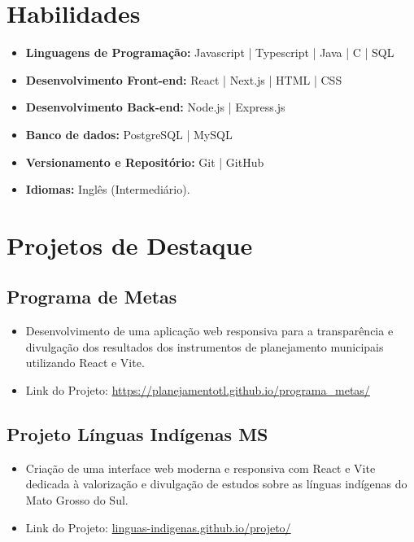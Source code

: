 \documentclass[a4paper,10pt]{article}
\begin{document}

\section{Habilidades}
    \begin{itemize}
        \item \textbf{Linguagens de Programação:}  Javascript | Typescript | Java | C | SQL 
        \item \textbf{Desenvolvimento Front-end:}  React | Next.js | HTML | CSS 
        \item \textbf{Desenvolvimento Back-end:}  Node.js | Express.js 
        \item \textbf{Banco de dados:}  PostgreSQL | MySQL 
        \item \textbf{Versionamento e Repositório:}  Git | GitHub  
        \item \textbf{Idiomas:} Inglês (Intermediário).
    \end{itemize}

\section{Projetos de Destaque} 
    
    \subsection*{\texorpdfstring{
            \textbf{Programa de Metas} \hfill 
        }{
            Programa de Metas -- Três Lagoas, MS
        }}
        \begin{itemize}
            \item Desenvolvimento de uma aplicação web responsiva para a transparência e divulgação dos resultados dos instrumentos de planejamento municipais utilizando React e Vite.
            \item Link do Projeto: \href{https://planejamentotl.github.io/programa\_metas/}{https://planejamentotl.github.io/programa\_metas/} 
        \end{itemize}

    \subsection*{\texorpdfstring{
            \textbf{Projeto Línguas Indígenas MS} \hfill
        }{
            Projeto Línguas Indígenas MS -- Remoto
        }}
        \begin{itemize}
            \item Criação de uma interface web moderna e responsiva com React e Vite dedicada à valorização e divulgação de estudos sobre as línguas indígenas do Mato Grosso do Sul.
            \item Link do Projeto: \href{https://linguas-indigenas.github.io/projeto/}{linguas-indigenas.github.io/projeto/}
        \end{itemize}

\end{document}
